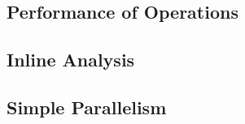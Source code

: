 \subsection{Performance of Operations}

\subsection{Inline Analysis}

\subsection{Simple Parallelism}


